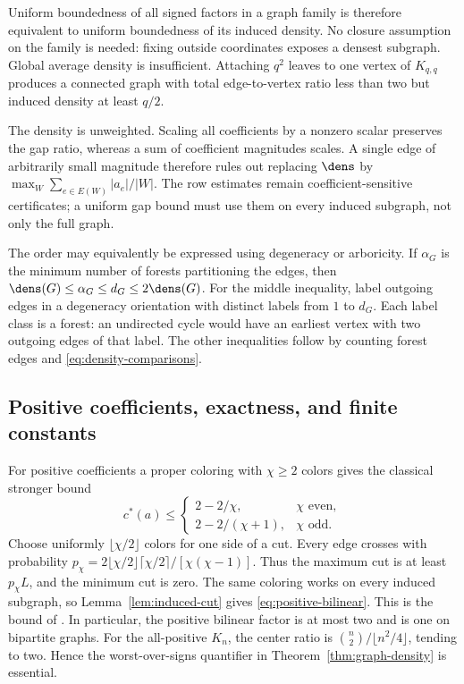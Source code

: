 Uniform boundedness of all signed factors in a graph family is therefore
equivalent to uniform boundedness of its induced density. No closure
assumption on the family is needed: fixing outside coordinates exposes a
densest subgraph. Global average density is insufficient. Attaching $q^2$
leaves to one vertex of $K_{q,q}$ produces a connected graph with total
edge-to-vertex ratio less than two but induced density at least $q/2$.

The density is unweighted. Scaling all coefficients by a nonzero scalar
preserves the gap ratio, whereas a sum of coefficient magnitudes scales.
A single edge of arbitrarily small magnitude therefore rules out replacing
$\dens$ by $\max_W\sum_{e\in E(W)}|a_e|/|W|$. The row estimates remain
coefficient-sensitive certificates; a uniform gap bound must use them on
every induced subgraph, not only the full graph.

The order may equivalently be expressed using degeneracy or arboricity.
If $\alpha_G$ is the minimum number of forests partitioning the edges,
then $\dens(G)\le\alpha_G\le d_G\le2\dens(G)$. For the middle inequality,
label outgoing edges in a degeneracy orientation with distinct labels
from $1$ to $d_G$. Each label class is a forest: an undirected cycle would
have an earliest vertex with two outgoing edges of that label. The other
inequalities follow by counting forest edges and
\eqref{eq:density-comparisons}.

\subsection{Positive coefficients, exactness, and finite constants}
For positive coefficients a proper coloring with $\chi\ge2$ colors gives
the classical stronger bound
\begin{equation}\label{eq:positive-bilinear}
 c^*(a)\le
 \begin{cases}2-2/\chi,&\chi\text{ even},\\
 2-2/(\chi+1),&\chi\text{ odd}.
 \end{cases}
\end{equation}
Choose uniformly $\lfloor\chi/2\rfloor$ colors for one side of a cut.
Every edge crosses with probability
$p_\chi=2\lfloor\chi/2\rfloor\lceil\chi/2\rceil/[\chi(\chi-1)]$.
Thus the maximum cut is at least $p_\chi L$, and the minimum cut is zero.
The same coloring works on every induced subgraph, so
Lemma~\ref{lem:induced-cut} gives \eqref{eq:positive-bilinear}.
This is the bound of \citet[Theorem 8 in the authors' manuscript]{Luedtke2012}.
In particular, the positive bilinear factor is at most two and is one on
bipartite graphs. For the all-positive $K_n$, the center ratio is
$\binom n2/\lfloor n^2/4\rfloor$, tending to two. Hence the worst-over-signs
quantifier in Theorem~\ref{thm:graph-density} is essential.

